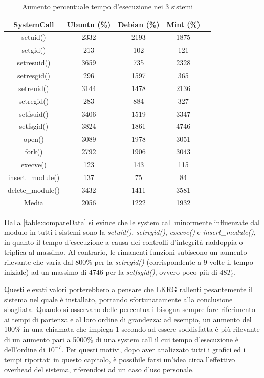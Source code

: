 \begin{table}[!htbp]
\centering
\begin{tabular}{|c|c|c|c|c|}
\hline
\textbf{SystemCall} & \bm{$\Delta$}\textbf{ Ubuntu (\%)} & \bm{$\Delta$}\textbf{ Debian (\%)} & \bm{$\Delta$}\textbf{ Mint (\%)} \\
\hline
setuid() & 2332 & 2193 & 1875 \\
\hline
setgid() & 213 & 102 & 121 \\
\hline
setresuid() & 3659 & 735 & 2328 \\
\hline
setresgid() & 296 & 1597 & 365 \\
\hline
setreuid() & 3144 & 1478 & 2136 \\
\hline
setregid() & 283 & 884 & 327 \\
\hline
setfsuid() & 3406 & 1519 & 3347 \\
\hline
setfsgid() & 3824 & 1861 & 4746 \\
\hline
open() & 3089 & 1978 & 3051 \\
\hline
fork() & 2792 & 1906 & 3043 \\
\hline
execve() & 123 & 143 & 115 \\
\hline
insert\_module() & 137 & 75 & 84 \\
\hline
delete\_module() & 3432 & 1411 & 3581 \\
\hline
\hline
Media & 2056 & 1222 & 1932 \\
\hline
\end{tabular}
\caption{Aumento percentuale tempo d'esecuzione nei 3 sistemi}
\label{table:compareData}
\end{table}

Dalla \autoref{table:compareData} si evince che le system call minormente influenzate dal modulo in tutti i sistemi sono la \emph{setuid()}, \emph{setregid()}, \emph{execve()} e \emph{insert\_module()}, in quanto il tempo d'esecuzione a causa dei controlli d'integrità raddoppia o triplica al massimo. Al contrario, le rimanenti funzioni subiscono un aumento rilevante che varia dal 800\% per la \emph{setregid()} (corrispondente a 9 volte il tempo iniziale) ad un massimo di 4746 per la \emph{setfsgid()}, ovvero poco più di $48T_i$.

Questi elevati valori porterebbero a pensare che LKRG rallenti pesantemente il sistema nel quale è installato, portando sfortunatamente alla conclusione sbagliata. Quando si osservano delle percentuali bisogna sempre fare riferimento ai tempi di partenza e al loro ordine di grandezza: ad esempio, un aumento del 100\% in una chiamata che impiega 1 secondo ad essere soddisfatta è più rilevante di un aumento pari a 5000\% di una system call il cui tempo d'esecuzione è dell'ordine di $10^{-7}$. Per questi motivi, dopo aver analizzato tutti i grafici ed i tempi riportati in questo capitolo, è possibile farsi un'idea circa l'effettivo overhead del sistema, riferendosi ad un caso d'uso personale.

